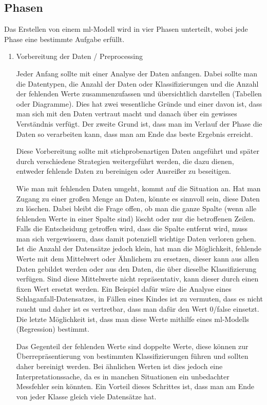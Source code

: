 \subsection{Phasen}

Das Erstellen von einem \Gls{ml}-Modell wird in vier Phasen unterteilt, wobei jede Phase eine bestimmte Aufgabe erfüllt.

\begin{enumerate}
      \item Vorbereitung der Daten / Preprocessing

            Jeder Anfang sollte mit einer Analyse der Daten anfangen. Dabei sollte man die Datentypen, die Anzahl der Daten oder Klassifizierungen und die Anzahl der fehlenden Werte zusammenzufassen und übersichtlich darstellen (Tabellen oder Diagramme). Dies hat zwei wesentliche Gründe und einer davon ist, dass man sich mit den Daten vertraut macht und danach über ein gewisses Verständnis verfügt. Der zweite Grund ist, dass man im Verlauf der Phase die Daten so verarbeiten kann, dass man am Ende das beste Ergebnis erreicht.

            Diese Vorbereitung sollte mit stichprobenartigen Daten angeführt und später durch verschiedene Strategien weitergeführt werden, die dazu dienen, entweder fehlende Daten zu bereinigen oder Ausreißer zu beseitigen.

            Wie man mit fehlenden Daten umgeht, kommt auf die Situation an.
            Hat man Zugang zu einer großen Menge an Daten, könnte es sinnvoll sein, diese Daten zu löschen. Dabei bleibt die Frage offen, ob man die ganze Spalte (wenn alle fehlenden Werte in einer Spalte sind) löscht oder nur die betroffenen Zeilen. Falls die Entscheidung getroffen wird, dass die Spalte entfernt wird, muss man sich vergewissern, dass damit potenziell wichtige Daten verloren gehen. Ist die Anzahl der Datensätze jedoch klein, hat man die Möglichkeit, fehlende Werte mit dem Mittelwert oder Ähnlichem zu ersetzen, dieser kann aus allen Daten gebildet werden oder aus den Daten, die über dieselbe Klassifizierung verfügen. Sind diese Mittelwerte nicht repräsentativ, kann dieser durch einen fixen Wert ersetzt werden. Ein Beispiel dafür wäre die Analyse eines Schlaganfall-Datensatzes, in Fällen eines Kindes ist zu vermuten, dass es nicht raucht und daher ist es vertretbar, dass man dafür den Wert 0/false einsetzt. Die letzte Möglichkeit ist, dass man diese Werte mithilfe eines \gls{ml}-Modells (Regression) bestimmt. \cite{MLkg}

            Das Gegenteil der fehlenden Werte sind doppelte Werte, diese können zur Überrepräsentierung von bestimmten Klassifizierungen führen und sollten daher bereinigt werden. Bei ähnlichen Werten ist dies jedoch eine Interpretationssache, da es in manchen Situationen ein unbedachter Messfehler sein könnten. Ein Vorteil dieses Schrittes ist, dass man am Ende von jeder Klasse gleich viele Datensätze hat.


\end{enumerate}
